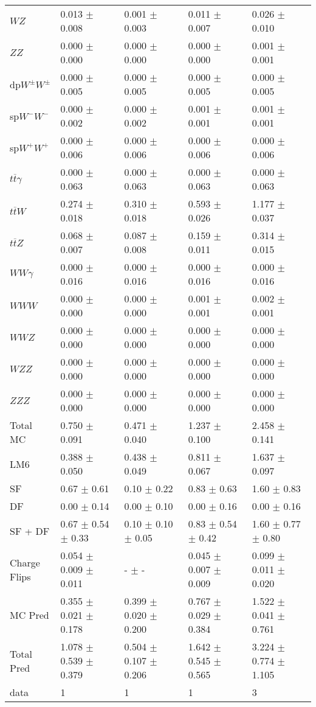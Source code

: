 \begin{tabular}{l | l l l l}
$WZ$ &  0.013 $\pm$  0.008 &  0.001 $\pm$  0.003 &  0.011 $\pm$  0.007 &  0.026 $\pm$  0.010\\
$ZZ$ &  0.000 $\pm$   0.000 &   0.000 $\pm$   0.000 &   0.000 $\pm$   0.000 &  0.001 $\pm$  0.001\\
\hline
dp$W^{\pm}W^{\pm}$ &  0.000 $\pm$  0.005 &  0.000 $\pm$  0.005 &  0.000 $\pm$  0.005 &  0.000 $\pm$  0.005\\
sp$W^{-}W^{-}$ &  0.000 $\pm$  0.002 &  0.000 $\pm$  0.002 &  0.001 $\pm$  0.001 &  0.001 $\pm$  0.001\\
sp$W^{+}W^{+}$ &  0.000 $\pm$  0.006 &  0.000 $\pm$  0.006 &  0.000 $\pm$  0.006 &  0.000 $\pm$  0.006\\
$t\overline{t}\gamma$ &  0.000 $\pm$  0.063 &  0.000 $\pm$  0.063 &  0.000 $\pm$  0.063 &  0.000 $\pm$  0.063\\
$t\overline{t}W$ &  0.274 $\pm$  0.018 &  0.310 $\pm$  0.018 &  0.593 $\pm$  0.026 &  1.177 $\pm$  0.037\\
$t\overline{t}Z$ &  0.068 $\pm$  0.007 &  0.087 $\pm$  0.008 &  0.159 $\pm$  0.011 &  0.314 $\pm$  0.015\\
$WW\gamma$ &  0.000 $\pm$  0.016 &  0.000 $\pm$  0.016 &  0.000 $\pm$  0.016 &  0.000 $\pm$  0.016\\
$WWW$ &   0.000 $\pm$   0.000 &   0.000 $\pm$   0.000 &  0.001 $\pm$  0.001 &  0.002 $\pm$  0.001\\
$WWZ$ &  0.000 $\pm$   0.000 &  0.000 $\pm$   0.000 &  0.000 $\pm$   0.000 &  0.000 $\pm$   0.000\\
$WZZ$ &   0.000 $\pm$   0.000 &   0.000 $\pm$   0.000 &   0.000 $\pm$   0.000 &   0.000 $\pm$   0.000\\
$ZZZ$ &  0.000 $\pm$   0.000 &   0.000 $\pm$   0.000 &   0.000 $\pm$   0.000 &   0.000 $\pm$   0.000\\
\hline
Total MC &  0.750 $\pm$  0.091 &  0.471 $\pm$  0.040 &  1.237 $\pm$  0.100 &  2.458 $\pm$  0.141\\
\hline\hline
\hline
LM6 &  0.388 $\pm$  0.050 &  0.438 $\pm$  0.049 &  0.811 $\pm$  0.067 &  1.637 $\pm$  0.097\\
\hline\hline
\hline\hline
 SF  & 0.67 $\pm$ 0.61 & 0.10 $\pm$ 0.22 & 0.83 $\pm$ 0.63 & 1.60 $\pm$ 0.83\\
 DF  & 0.00 $\pm$ 0.14 & 0.00 $\pm$ 0.10 & 0.00 $\pm$ 0.16 & 0.00 $\pm$ 0.16\\
\hline
 SF + DF  & 0.67 $\pm$ 0.54 $\pm$ 0.33 & 0.10 $\pm$ 0.10 $\pm$ 0.05 & 0.83 $\pm$ 0.54 $\pm$ 0.42 & 1.60 $\pm$ 0.77 $\pm$ 0.80\\
\hline\hline
Charge Flips & 0.054 $\pm$ 0.009 $\pm$ 0.011 & - $\pm$ - & 0.045 $\pm$ 0.007 $\pm$ 0.009 & 0.099 $\pm$ 0.011 $\pm$ 0.020\\
\hline\hline
\hline
MC Pred &  0.355 $\pm$  0.021 $\pm$  0.178 &  0.399 $\pm$  0.020 $\pm$  0.200 &  0.767 $\pm$  0.029 $\pm$  0.384 &  1.522 $\pm$  0.041 $\pm$  0.761\\
\hline\hline
Total Pred &  1.078 $\pm$  0.539 $\pm$  0.379 &  0.504 $\pm$  0.107 $\pm$  0.206 &  1.642 $\pm$  0.545 $\pm$  0.565 &  3.224 $\pm$  0.774 $\pm$  1.105\\
\hline\hline
data & 1 & 1 & 1 & 3\\
\hline\hline
\end{tabular}
